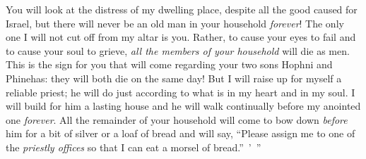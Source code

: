 \begin{biblechapter}
\verse You will look at the distress of my dwelling place, despite all the good caused for Israel, but there will never be an old man in your household \textit{forever}!
\verse The only one I will not cut off from my altar is you. Rather, to cause your eyes to fail and to cause your soul to grieve, \textit{all the members of your household} will die as men.
\verse This is the sign for you that will come regarding your two sons Hophni and Phinehas: they will both die on the same day!
\verse But I will raise up for myself a reliable priest; he will do just according to what is in my heart and in my soul. I will build for him a lasting house and he will walk continually before my anointed one \textit{forever}.
\verse All the remainder of your household will come to bow down \textit{before} him for a bit of silver or a loaf of bread and will say, “Please assign me to one of the \textit{priestly offices} so that I can eat a morsel of bread.” ’ ”
\end{biblechapter}

